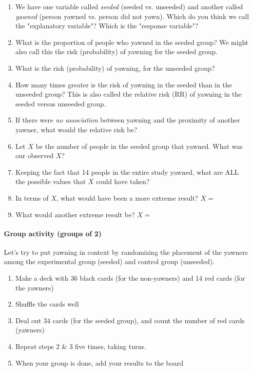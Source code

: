 \documentclass[10pt]{article}\usepackage[]{graphicx}\usepackage[]{color}
\begin{document}
\begin{enumerate}
  \itemsep2cm
  \item We have one variable called \emph{seeded} (seeded vs. unseeded) and another called \emph{yawned} (person yawned vs. person did not yawn). Which do you think we call the "explanatory variable"?  Which is the "response variable"? 
  \item What is the proportion of people who yawned in the seeded group? We might also call this the risk (probability) of yawning for the seeded group.
  \item What is the risk (probability) of yawning, for the unseeded group?
  \item How many times greater is the risk of yawning in the seeded than in the unseeded group? This is also called the relative risk (RR) of yawning in the seeded versus unseeded group.
  \item If there were \emph{no association} between yawning and the proximity of another yawner, what would the relative risk be?
  \item Let $X$ be the number of people in the seeded group that yawned. What was our observed $X$?
  \item Keeping the fact that 14 people in the entire study yawned, what are ALL the possible values that $X$ could have taken?
  \item In terms of $X$, what would have been a more extreme result?  $X = $
  \item What would another extreme result be?  $X = $
\end{enumerate}

\newpage

\paragraph{Group activity (groups of 2)} Let's try to put yawning in context by randomizing the placement of the yawners among the experimental group (seeded) and control group (unseeded). 
\begin{enumerate}
  \itemsep0cm
  \item Make a deck with 36 black cards (for the non-yawners) and 14 red cards (for the yawners)
  \item Shuffle the cards well
  \item Deal out 34 cards (for the seeded group), and count the number of red cards (yawners)
  \item Repeat steps 2 \& 3 five times, taking turns.
  \item When your group is done, add your results to the board
\end{enumerate}
\end{document}

